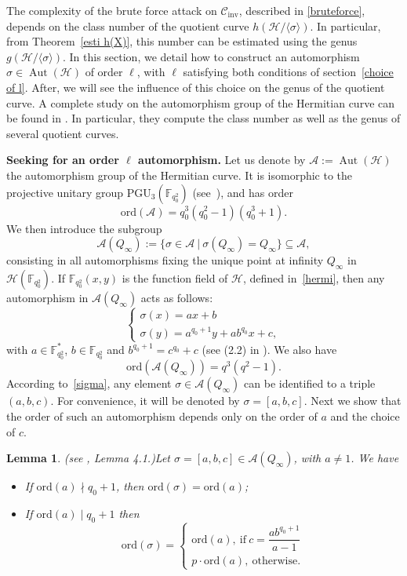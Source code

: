 \documentclass[10pt]{article}
\newtheorem{lem1}[thm]{Lemma}
\theoremstyle{definition}
\theoremstyle{definition}
\theoremstyle{definition}
\newcommand{\cd}{\cdot}
\newcommand{\C}{\mathcal{C}}
\newcommand{\calA}{\mathcal{A}}
\newcommand{\calH}{\mathcal{H}}
\newcommand{\su}{\subseteq}
\newcommand{\h}{\mathcal{H}}
\newcommand{\Aut}{\operatorname{Aut}}
\begin{document}
The complexity of the brute force attack on $\C_{\textrm{inv}}$, described in \ref{bruteforce}, depends on the class number of the quotient curve $h(\mathcal{H}/\langle \sigma \rangle)$. In particular, from Theorem~\ref{esti h(X)}, this number can be estimated using the genus $g(\mathcal{H}/\langle \sigma \rangle)$. In this section, we detail how to construct an automorphism $\sigma \in \Aut(\h)$ of order $\ell$, with $\ell$ satisfying both conditions of section~\ref{choice of l}. After, we will see the influence of this choice on the genus of the quotient curve. A complete study on the automorphism group of the Hermitian curve can be found in \cite{Gar}. In particular, they compute the class number as well as the genus of several quotient curves. 



 \textbf{Seeking for an order $\ell$ automorphism.} Let us denote by $\calA := \Aut(\calH)$ the automorphism group of the Hermitian curve. It is isomorphic to the projective unitary group $\mathrm{PGU}_3(\mathbb{F}_{q_0^2})$ (see~\cite{Sti}), and has order 
\[\mathrm{ord}(\calA) =  q_0^3(q_0^2-1)(q_0^3+1).\]
We then introduce the subgroup
\[\calA(Q_{\infty}) := \{ \sigma \in \calA \ | \ \sigma(Q_{\infty}) = Q_{\infty}\} \su \calA ,\]
consisting in all automorphisms fixing the unique point at infinity $Q_{\infty}$ in $\calH(\mathbb{F}_{q_0^2})$. If $\mathbb{F}_{q_0^2}(x,y)$ is the function field of $\h$, defined in~\eqref{hermi}, then any automorphism in $\calA(Q_{\infty})$ acts as follows:
\begin{equation} \label{sigma}
\left\{ \begin{array}{ll}
\sigma(x) = ax+b \\
\sigma(y) = a^{q_0+1}y+ab^{q_0}x+c,
\end{array} \right.
\end{equation}
with $a \in \mathbb{F}_{q_0^2}^*$, $b \in \mathbb{F}_{q_0^2}$ and $b^{q_0+1} = c^{q_0}+c$ (see (2.2) in \cite{Gar}). We also have 
\[\mathrm{ord}(\calA(Q_{\infty})) = q^3(q^2-1).\]
According to~\eqref{sigma}, any element $\sigma \in \calA(Q_{\infty})$ can be identified to a triple $(a,b,c)$. For convenience, it will be denoted by $\sigma=[a,b,c]$.
Next we show that the order of such an automorphism depends only on the order of $a$ and the choice of $c$.

\begin{lem1}(see \cite{Gar}, Lemma 4.1.)\label{ordsigma}
Let $\sigma = [a,b,c] \in \calA(Q_{\infty})$, with $a \neq 1$. We have
\begin{itemize}
\item[(i)] If $\mathrm{ord}(a) \nmid q_0+1$, then $\mathrm{ord}(\sigma) = \mathrm{ord}(a)$;
\item[(ii)] If $\mathrm{ord}(a) \mid q_0+1$ then
\begin{equation*}
\mathrm{ord}(\sigma) = \left\{\begin{array}{ll}
\mathrm{ord}(a), \ \mathrm{if} \ c=\dfrac{ab^{q_0+1}}{a-1} \\
p \cd \mathrm{ord}(a), \  \mathrm{otherwise}. 
\end{array}
\right.
\end{equation*}
\end{itemize}
\end{lem1}
\end{document}
